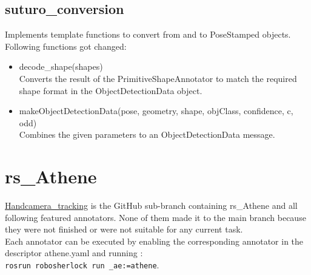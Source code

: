 \documentclass[main.tex]{subfiles}
\begin{document}
\subsection{suturo\_conversion}
Implements template functions to convert from and to PoseStamped objects.
Following functions got changed:

\begin{itemize}
\item decode\_shape(shapes)\\
Converts the result of the PrimitiveShapeAnnotator to match the required shape format in the ObjectDetectionData object.

\item makeObjectDetectionData(pose, geometry, shape, objClass, confidence, c, odd)\\
Combines the given parameters to an ObjectDetectionData message.
\end{itemize}

			\section{rs\_Athene}
\href{https://github.com/SUTURO/suturo_perception/tree/Handcamera_tracking}{Handcamera\_tracking} is the GitHub sub-branch containing rs\_Athene and all following featured annotators. 
None of them made it to the main branch because they were not finished or were not suitable for any current task. \\
Each annotator can be executed by enabling the corresponding annotator in the descriptor athene.yaml and running : \\
\texttt{rosrun robosherlock run \_ae:=athene}. 
\end{document}
